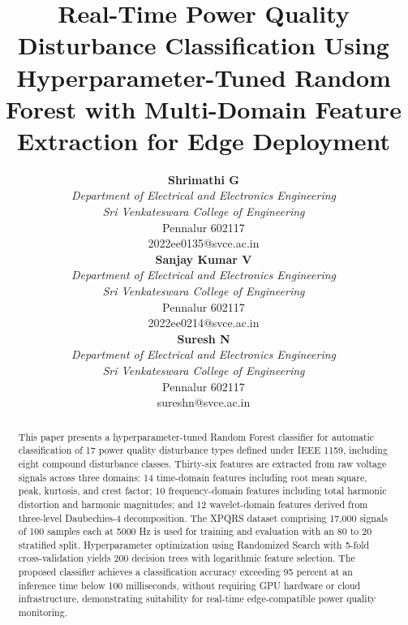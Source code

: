 \documentclass[conference]{IEEEtran}
\begin{document}
\title{Real-Time Power Quality Disturbance Classification Using Hyperparameter-Tuned Random Forest with Multi-Domain Feature Extraction for Edge Deployment\\
}

\author{
\begin{minipage}{0.32\textwidth}
\centering
\textbf{Shrimathi G} \\
\textit{Department of Electrical and Electronics Engineering} \\
\textit{Sri Venkateswara College of Engineering} \\
Pennalur 602117 \\
2022ee0135@svce.ac.in
\end{minipage}
\hfill
\begin{minipage}{0.32\textwidth}
\centering
\textbf{Sanjay Kumar V} \\
\textit{Department of Electrical and Electronics Engineering} \\
\textit{Sri Venkateswara College of Engineering} \\
Pennalur 602117 \\
2022ee0214@svce.ac.in
\end{minipage}
\hfill
\begin{minipage}{0.32\textwidth}
\centering
\textbf{Suresh N} \\
\textit{Department of Electrical and Electronics Engineering} \\
\textit{Sri Venkateswara College of Engineering} \\
Pennalur 602117 \\
sureshn@svce.ac.in
\end{minipage}
}
\maketitle

\begin{abstract}
This paper presents a hyperparameter-tuned Random Forest classifier for automatic classification of 17 power quality disturbance types defined under IEEE 1159, including eight compound disturbance classes. Thirty-six features are extracted from raw voltage signals across three domains: 14 time-domain features including root mean square, peak, kurtosis, and crest factor; 10 frequency-domain features including total harmonic distortion and harmonic magnitudes; and 12 wavelet-domain features derived from three-level Daubechies-4 decomposition. The XPQRS dataset comprising 17,000 signals of 100 samples each at 5000 Hz is used for training and evaluation with an 80 to 20 stratified split. Hyperparameter optimization using Randomized Search with 5-fold cross-validation yields 200 decision trees with logarithmic feature selection. The proposed classifier achieves a classification accuracy exceeding 95 percent at an inference time below 100 milliseconds, without requiring GPU hardware or cloud infrastructure, demonstrating suitability for real-time edge-compatible power quality monitoring.
\end{abstract}
\end{document}
